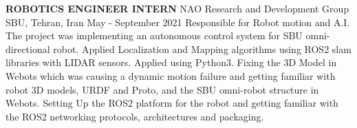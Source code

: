 \begin{cventries}
    \cventry
    {\textbf{ROBOTICS ENGINEER INTERN}}
    {NAO Research and Development Group}
    {SBU, Tehran, Iran}
    {May - September 2021}
    {Responsible for Robot motion and A.I. 
    \newline The project was implementing an autonomous control system for SBU omni-directional robot. Applied Localization and Mapping algorithms using ROS2 slam libraries with LIDAR sensors. 
    \newline Applied  using Python3. 
    \newline Fixing the 3D Model in Webots which was causing a dynamic motion failure and getting familiar with robot 3D models, URDF and Proto, and the SBU omni-robot structure in Webots. 
    \newline Setting Up the ROS2 platform for the robot and getting familiar with the ROS2 networking protocols, architectures and packaging.}
\end{cventries}